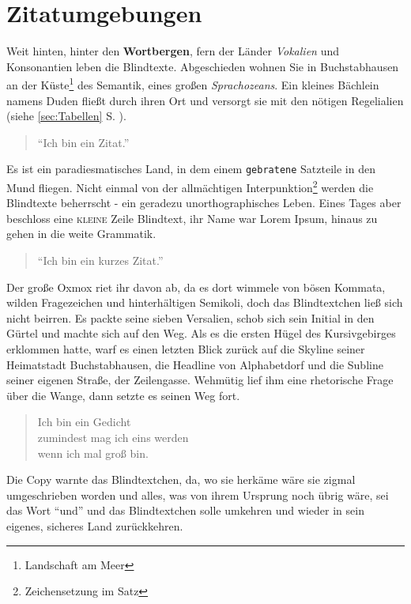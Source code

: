 \documentclass[%
	12pt,%
	a4paper,%
	oneside,%
	listof=totoc,
 	index=totoc,
	bibliography = totoc,
	parskip = half,%
	chapterprefix=false,%
	appendixprefix, %
headings=small,%
]{scrreprt}
\begin{document}
\chapter{Zitatumgebungen}
\label{sec:Zitate}

Weit hinten, hinter den \textbf{Wortbergen}, fern der Länder \textit{Vokalien} und Konsonantien leben die Blindtexte. Abgeschieden wohnen Sie in Buchstabhausen an der Küste\footnote{Landschaft am Meer}
des Semantik, eines großen \textsl{Sprachozeans}. Ein kleines Bächlein namens Duden fließt durch ihren Ort und versorgt sie mit den nötigen Regelialien (siehe \ref{sec:Tabellen} S. \pageref{sec:Tabellen}).

\begin{quotation}
	"`Ich bin ein Zitat."'
\end{quotation}

Es ist ein paradiesmatisches Land, in dem einem \texttt{gebratene} Satzteile in den Mund fliegen. Nicht einmal von der allmächtigen Interpunktion\footnote{Zeichensetzung im Satz} werden die Blindtexte beherrscht - ein geradezu unorthographisches Leben. Eines Tages aber beschloss eine \textsc{kleine} Zeile Blindtext, ihr Name war Lorem Ipsum, hinaus zu gehen in die weite Grammatik. \begin{quote}"`Ich bin ein kurzes Zitat."'\end{quote} Der große Oxmox riet ihr davon ab, da es dort wimmele von bösen Kommata, wilden Fragezeichen und hinterhältigen Semikoli, doch das Blindtextchen ließ sich nicht beirren. Es packte seine sieben Versalien, schob sich sein Initial in den Gürtel und machte sich auf den Weg. Als es die ersten Hügel des Kursivgebirges erklommen hatte, warf es einen letzten Blick zurück auf die Skyline seiner Heimatstadt Buchstabhausen, die Headline von Alphabetdorf und die Subline seiner eigenen Straße, der Zeilengasse. Wehmütig lief ihm eine rhetorische Frage über die Wange, dann setzte es seinen Weg fort.

\begin{verse}
	Ich bin ein Gedicht\\
	zumindest mag ich eins werden\\
	wenn ich mal groß bin.
\end{verse}

Die Copy warnte das Blindtextchen, da, wo sie herkäme wäre sie zigmal umgeschrieben worden und alles, was von ihrem Ursprung noch übrig wäre, sei das Wort "`und"'  und das Blindtextchen solle umkehren und wieder in sein eigenes, sicheres Land zurückkehren.
\end{document}
